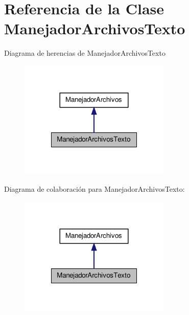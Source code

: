 \hypertarget{class_manejador_archivos_texto}{\section{\-Referencia de la \-Clase \-Manejador\-Archivos\-Texto}
\label{class_manejador_archivos_texto}
}


\-Diagrama de herencias de \-Manejador\-Archivos\-Texto
\nopagebreak
\begin{figure}[H]
\begin{center}
\leavevmode
\includegraphics[width=204pt]{class_manejador_archivos_texto__inherit__graph}
\end{center}
\end{figure}


\-Diagrama de colaboración para \-Manejador\-Archivos\-Texto\-:
\nopagebreak
\begin{figure}[H]
\begin{center}
\leavevmode
\includegraphics[width=204pt]{class_manejador_archivos_texto__coll__graph}
\end{center}
\end{figure}
